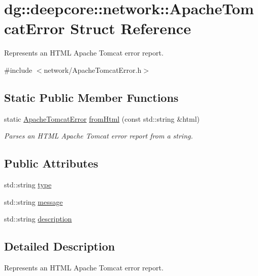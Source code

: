 \hypertarget{structdg_1_1deepcore_1_1network_1_1_apache_tomcat_error}{}\section{dg\+:\+:deepcore\+:\+:network\+:\+:Apache\+Tomcat\+Error Struct Reference}
\label{structdg_1_1deepcore_1_1network_1_1_apache_tomcat_error}


Represents an H\+T\+ML Apache Tomcat error report.  




{\ttfamily \#include $<$network/\+Apache\+Tomcat\+Error.\+h$>$}

\subsection*{Static Public Member Functions}
\begin{DoxyCompactItemize}
\item 
static \hyperlink{structdg_1_1deepcore_1_1network_1_1_apache_tomcat_error}{Apache\+Tomcat\+Error} \hyperlink{group___network_module_ga84792c450664512e6891ecccbb205944}{from\+Html} (const std\+::string \&html)
\begin{DoxyCompactList}\small\item\em Parses an H\+T\+ML Apache Tomcat error report from a string. \end{DoxyCompactList}\end{DoxyCompactItemize}
\subsection*{Public Attributes}
\begin{DoxyCompactItemize}
\item 
std\+::string \hyperlink{structdg_1_1deepcore_1_1network_1_1_apache_tomcat_error_ab36a2b24595385f2b1f169317249dcf0}{type}
\item 
std\+::string \hyperlink{structdg_1_1deepcore_1_1network_1_1_apache_tomcat_error_a7a12e42bbfd8fa3548a148b67e5a8fb1}{message}
\item 
std\+::string \hyperlink{structdg_1_1deepcore_1_1network_1_1_apache_tomcat_error_a0ecd13bf1b2c5af20f99af250abb38f0}{description}
\end{DoxyCompactItemize}


\subsection{Detailed Description}
Represents an H\+T\+ML Apache Tomcat error report. 

